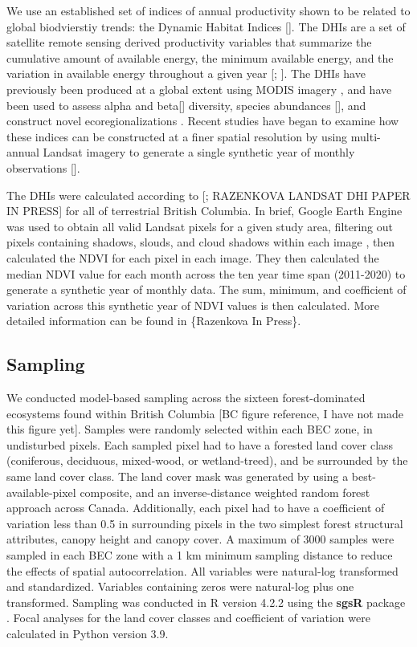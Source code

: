 \documentclass[
  authoryear,
  review,
  3p,
  twocolumn]{elsarticle}
\begin{document}
We use an established set of indices of annual productivity shown to be
related to global biodvierstiy trends: the Dynamic Habitat Indices
{[}\citet{radeloff2019}{]}. The DHIs are a set of satellite remote
sensing derived productivity variables that summarize the cumulative
amount of available energy, the minimum available energy, and the
variation in available energy throughout a given year
{[}\citet{berry2007}; \citet{radeloff2019}{]}. The DHIs have previously
been produced at a global extent using MODIS imagery , and have been
used to assess alpha \citep{radeloff2019} and
beta{[}\citet{andrew2012}{]} diversity, species abundances
{[}\citet{razenkova}{]}, and construct novel ecoregionalizations
\citep{coops2009, andrew2013} . Recent studies have began to examine how
these indices can be constructed at a finer spatial resolution by using
multi-annual Landsat imagery to generate a single synthetic year of
monthly observations {[}\citet{razenkova2022}{]}.

The DHIs were calculated according to {[}\citet{razenkova2022};
RAZENKOVA LANDSAT DHI PAPER IN PRESS{]} for all of terrestrial British
Columbia. In brief, Google Earth Engine \citep{gorelick2017} was used to
obtain all valid Landsat pixels for a given study area, filtering out
pixels containing shadows, slouds, and cloud shadows within each image
\citep{zhu2012}, then calculated the NDVI for each pixel in each image.
They then calculated the median NDVI value for each month across the ten
year time span (2011-2020) to generate a synthetic year of monthly data.
The sum, minimum, and coefficient of variation across this synthetic
year of NDVI values is then calculated. More detailed information can be
found in \{Razenkova In Press\}.

\hypertarget{sampling}{%
\subsection{Sampling}\label{sampling}}

We conducted model-based sampling across the sixteen forest-dominated
ecosystems found within British Columbia {[}BC figure reference, I have
not made this figure yet{]}. Samples were randomly selected within each
BEC zone, in undisturbed pixels. Each sampled pixel had to have a
forested land cover class (coniferous, deciduous, mixed-wood, or
wetland-treed), and be surrounded by the same land cover class. The land
cover mask was generated by \citet[need to add to
zotero]{hermosilla2022} using a best-available-pixel composite, and an
inverse-distance weighted random forest approach across Canada.
Additionally, each pixel had to have a coefficient of variation less
than 0.5 in surrounding pixels in the two simplest forest structural
attributes, canopy height and canopy cover. A maximum of 3000 samples
were sampled in each BEC zone with a 1 km minimum sampling distance to
reduce the effects of spatial autocorrelation. All variables were
natural-log transformed and standardized. Variables containing zeros
were natural-log plus one transformed. Sampling was conducted in R
\citep{R-base} version 4.2.2 using the \textbf{sgsR} package
\citep{R-sgsR}. Focal analyses for the land cover classes and
coefficient of variation were calculated in Python version 3.9.
\end{document}
